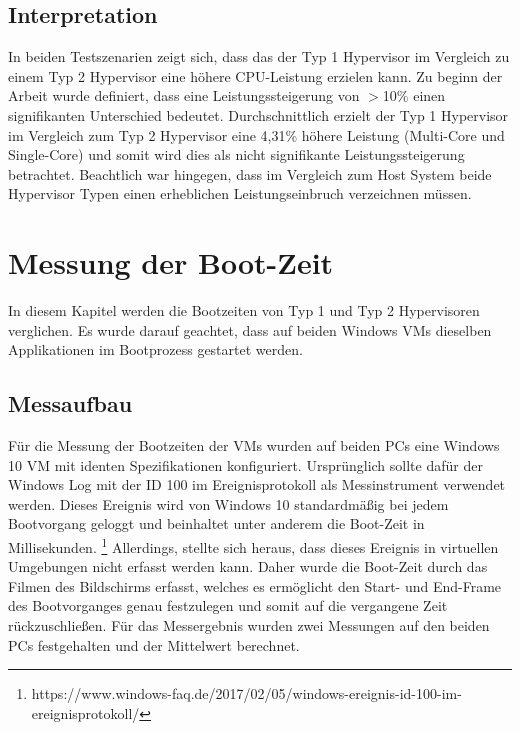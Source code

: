 \documentclass[conference]{IEEEtran}
\begin{document}
\subsection{Interpretation}
In beiden Testszenarien zeigt sich, dass das der Typ 1 Hypervisor im Vergleich zu einem Typ 2 Hypervisor eine höhere CPU-Leistung erzielen kann. Zu beginn der Arbeit wurde definiert, dass eine Leistungssteigerung von $>$10\% einen signifikanten Unterschied bedeutet. Durchschnittlich erzielt der Typ 1 Hypervisor im Vergleich zum Typ 2 Hypervisor eine 4,31\% höhere Leistung (Multi-Core und Single-Core) und somit wird dies als nicht signifikante Leistungssteigerung betrachtet. Beachtlich war hingegen, dass im Vergleich zum Host System beide Hypervisor Typen einen erheblichen Leistungseinbruch verzeichnen müssen.

\section{Messung der Boot-Zeit}
\label{Messung der Boot-Zeit}
In diesem Kapitel werden die Bootzeiten von Typ 1 und Typ 2 Hypervisoren verglichen. Es wurde darauf geachtet, dass auf beiden Windows VMs dieselben Applikationen im Bootprozess gestartet werden.

\subsection{Messaufbau}
Für die Messung der Bootzeiten der VMs wurden auf beiden PCs eine Windows 10 VM mit identen Spezifikationen konfiguriert. Ursprünglich sollte dafür der Windows Log mit der ID 100 im Ereignisprotokoll als Messinstrument verwendet werden. Dieses Ereignis wird von Windows 10 standardmäßig bei jedem Bootvorgang geloggt und beinhaltet unter anderem die Boot-Zeit in Millisekunden. \footnote{https://www.windows-faq.de/2017/02/05/windows-ereignis-id-100-im-ereignisprotokoll/} Allerdings, stellte sich heraus, dass dieses Ereignis in virtuellen Umgebungen nicht erfasst werden kann. Daher wurde die Boot-Zeit durch das Filmen des Bildschirms erfasst, welches es ermöglicht den Start- und End-Frame des Bootvorganges genau festzulegen und somit auf die vergangene Zeit rückzuschließen. Für das Messergebnis wurden zwei Messungen auf den beiden PCs festgehalten und der Mittelwert berechnet. 
\end{document}

